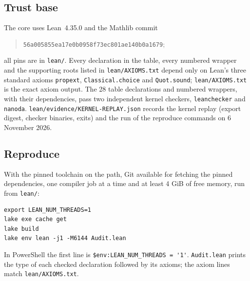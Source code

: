 \documentclass[11pt]{article}
\theoremstyle{definition}
\theoremstyle{remark}
\numberwithin{equation}{section}
\newcommand{\lean}[1]{\nolinkurl{#1}}
\begin{document}
\subsection*{Trust base}
The core uses Lean~4.35.0 and the Mathlib commit
\begin{quote}\small
\nolinkurl{56a005855ea17e0b0958f73ec801ae140b0a1679};
\end{quote}
all pins are in \lean{lean/}. Every declaration in the table, every numbered
wrapper and the supporting roots listed in \lean{lean/AXIOMS.txt} depend only
on Lean's three standard axioms \lean{propext}, \lean{Classical.choice} and
\lean{Quot.sound}; \lean{lean/AXIOMS.txt} is the exact axiom output.
The 28 table declarations and numbered wrappers, with their dependencies,
pass two independent kernel checkers, \lean{leanchecker} and \lean{nanoda}.
\lean{lean/evidence/KERNEL-REPLAY.json} records the kernel replay (export digest,
checker binaries, exits) and the run of the reproduce commands on 6 November 2026.

\subsection*{Reproduce}
With the pinned toolchain on the path, Git available for fetching the pinned
dependencies, one compiler job at a time and at least 4 GiB of free memory,
run from \lean{lean/}:
\begin{verbatim}
export LEAN_NUM_THREADS=1
lake exe cache get
lake build
lake env lean -j1 -M6144 Audit.lean
\end{verbatim}
In PowerShell the first line is \verb|$env:LEAN_NUM_THREADS = '1'|.
\lean{Audit.lean} prints the type of each checked declaration followed by its
axioms; the axiom lines match \lean{lean/AXIOMS.txt}.
\end{document}
